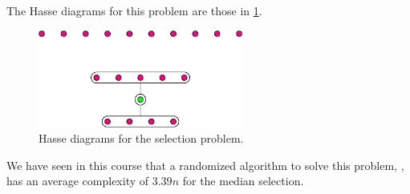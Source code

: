The Hasse diagrams for this problem are those in \ref{fig:selection:diag}.

\begin{figure}
	\centering
	\includegraphics[width=0.6\textwidth]{fig/selection:diag}
	\caption{\label{fig:selection:diag} Hasse diagrams for the selection problem.}
\end{figure}


We have seen in this course that a randomized algorithm to solve this problem, , has an average complexity of $3.39n$ for the median selection.